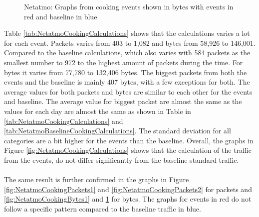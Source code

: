 \begin{figure}[H]
\begin{subfigure}[b]{0.47\textwidth}
        \centering
    \end{subfigure}
        \begin{subfigure}[b]{0.47\textwidth}
        \centering
    \end{subfigure}
    \begin{subfigure}[b]{0.47\textwidth}
        \centering
    \end{subfigure}
    \begin{subfigure}[b]{0.47\textwidth}
        \centering
    \end{subfigure}
    \hspace{0.6cm}
    \begin{subfigure}[b]{0.47\textwidth}
    \centering
        \end{subfigure}
    \caption{Netatmo: Graphs from cooking events shown in bytes with events in red and baseline in blue}
    \label{fig:NetatmoCookingBytes2}
\end{figure}

Table \ref{tab:NetatmoCookingCalculations} shows that the calculations varies a lot for each event. Packets varies from 403 to 1,082 and bytes from 58,926 to 146,001. Compared to the baseline calculations, which also varies with 584 packets as the smallest number to 972 to the highest amount of packets during the time. For bytes it varies from 77,780 to 132,406 bytes. The biggest packets from both the events and the baseline is mainly 407 bytes, with a few exceptions for both. The average values for both packets and bytes are similar to each other for the events and baseline. The average value for biggest packet are almost the same as the values for each day are almost the same as shown in Table in \ref{tab:NetatmoCookingCalculations} and \ref{tab:NetatmoBaselineCookingCalculations}. The standard deviation for all categories are a bit higher for the events than the baseline. Overall, the graphs in Figure \ref{fig:NetatmoCookingCalculations} shows that the calculation of the traffic from the events, do not differ significantly from the baseline standard traffic.
\\\\
The same result is further confirmed in the graphs in Figure \ref{fig:NetatmoCookingPackets1} and \ref{fig:NetatmoCookingPackets2} for packets and \ref{fig:NetatmoCookingBytes1} and \ref{fig:NetatmoCookingBytes2} for bytes. The graphs for events in red do not follow a specific pattern compared to the baseline traffic in blue. 


